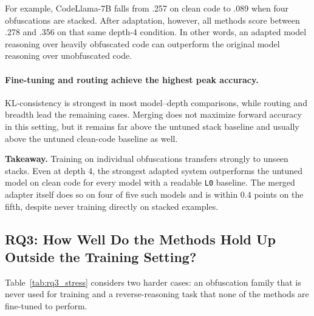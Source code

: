 For example, CodeLlama-7B falls from .257 on clean code to .089 when four
obfuscations are stacked. After adaptation, however, all methods score between
.278 and .356 on that same depth-4 condition. In other words, an adapted model
reasoning over heavily obfuscated code can outperform the original model
reasoning over unobfuscated code.

\paragraph{Fine-tuning and routing achieve the highest peak accuracy.}
KL-consistency is strongest in most model--depth comparisons, while routing
and breadth lead the remaining cases. Merging does not maximize forward
accuracy in this setting, but it remains far above the untuned stack baseline
and usually above the untuned clean-code baseline as well.

\begin{takeaway}
\textbf{Takeaway.}
Training on individual obfuscations transfers strongly to unseen stacks.
Even at depth 4, the strongest adapted system outperforms the untuned model
on clean code for every model with a readable \texttt{L0} baseline. The
merged adapter itself does so on four of five such models and is within
0.4 points on the fifth, despite never training directly on stacked examples.
\end{takeaway}

\FloatBarrier



\subsection{RQ3: How Well Do the Methods Hold Up Outside the Training Setting?}
\label{sec:rq3}

Table~\ref{tab:rq3_stress} considers two harder cases: an obfuscation family
that is never used for training and a reverse-reasoning task that none of the
methods are fine-tuned to perform.

